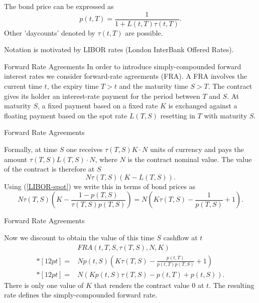 
	The bond price can be expressed as
$$
p(t,T)=\frac{1}{1+L(t,T)\tau(t,T)}.
$$
Other 'daycounts' denoted  by $\tau(t,T)$ are possible.

	Notation is motivated by LIBOR rates (London InterBank Offered
Rates).




{Forward Rate Agreements}
In order to introduce simply-compounded forward interest rates we
consider forward-rate agreements (FRA). A FRA involves the current
time $t$, the expiry time $T>t$ and the maturity time $S>T$. The
contract gives its holder an interest-rate payment for the period
between $T$ and $S$. At maturity $S$, a fixed payment based on a
fixed rate $K$ is exchanged against a floating payment based on
the spot rate $L(T,S)$ resetting in $T$ with maturity $S$.

{Forward Rate Agreements}

Formally, at time $S$ one receives $\tau(T,S)K\cdot N$ units of
currency and pays the amount $\tau(T,S)L(T,S)\cdot N$, where $N$
is the contract nominal value. The value of the contract is
therefore at $S$
\begin{equation}\label{FRA-1}
N\tau(T,S)(K-L(T,S)).
\end{equation}
Using (\ref{LIBOR-spot})
we write this in terms of bond prices as
$$
N\tau(T,S)\left(K-\frac{1-p(T,S)}{\tau(T,S)p(T,S)}\right)=N\left(K\tau(T,S)-\frac{1}{p(T,S)}+1\right).
$$

{Forward Rate Agreements}

Now we discount to obtain the value of this time $S$ cashflow at
$t$
$$
\begin{array}{ll}
& FRA(t,T,S,\tau(T,S),N,K) \\*[12pt] = & Np(t,S)\left(K\tau(T,S)-\frac{p(t,T)}{p(t,T)p(T,S)}+1\right) \\*[12pt]
  = &N(K p(t,S)\tau(T,S)-p(t,T)+p(t,S)).
\end{array}
$$
There is only one value of $K$ that renders the contract value $0$
at $t$. The resulting rate defines the simply-compounded forward
rate.

